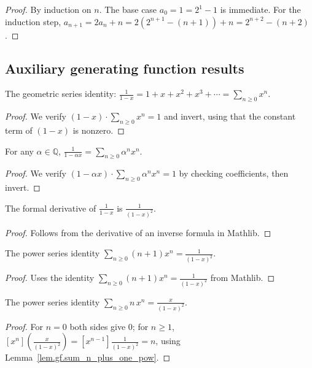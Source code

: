 \begin{proof}
\leanok
By induction on $n$. The base case $a_0 = 1 = 2^1 - 1$ is immediate.
For the induction step, $a_{n+1} = 2a_n + n = 2(2^{n+1}-(n+1)) + n = 2^{n+2} - (n+2)$.
\end{proof}

\subsection{Auxiliary generating function results}

\begin{lemma}
\label{lem.gf.geometric_series}
\leanhelper
\leanok
The geometric series identity:
$\frac{1}{1-x} = 1 + x + x^2 + x^3 + \cdots = \sum_{n\geq 0} x^n$.
\end{lemma}

\begin{proof}
\leanok
We verify $(1-x)\cdot\sum_{n\geq 0}x^n = 1$ and invert,
using that the constant term of $(1-x)$ is nonzero.
\end{proof}

\begin{lemma}
\label{lem.gf.geometric_series_scaled}
\leanhelper
\leanok
For any $\alpha \in \mathbb{Q}$,
$\frac{1}{1-\alpha x} = \sum_{n\geq 0}\alpha^n x^n$.
\end{lemma}

\begin{proof}
\leanok
We verify $(1-\alpha x)\cdot\sum_{n\geq 0}\alpha^n x^n = 1$ by checking coefficients,
then invert.
\end{proof}

\begin{lemma}
\label{lem.gf.deriv_inv_one_minus_x}
\leanhelper
\leanok
The formal derivative of $\frac{1}{1-x}$ is $\frac{1}{(1-x)^2}$.
\end{lemma}

\begin{proof}
\leanok
Follows from the derivative of an inverse formula in Mathlib.
\end{proof}

\begin{lemma}
\label{lem.gf.sum_n_plus_one_pow}
\leanhelper
\leanok
The power series identity
$\sum_{n\geq 0}(n+1)x^n = \frac{1}{(1-x)^2}$.
\end{lemma}

\begin{proof}
\leanok
Uses the identity $\sum_{n\geq 0}(n+1)x^n = \frac{1}{(1-x)^2}$
from Mathlib.
\end{proof}

\begin{lemma}
\label{lem.gf.sum_n_pow}
\leanhelper
\leanok
The power series identity
$\sum_{n\geq 0}n\, x^n = \frac{x}{(1-x)^2}$.
\end{lemma}

\begin{proof}
\leanok
For $n=0$ both sides give $0$; for $n \geq 1$,
$[x^n]\left(\frac{x}{(1-x)^2}\right) = [x^{n-1}]\frac{1}{(1-x)^2} = n$,
using Lemma~\ref{lem.gf.sum_n_plus_one_pow}.
\end{proof}
